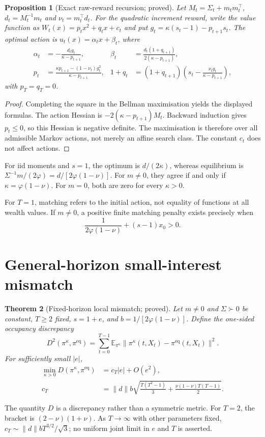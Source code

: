 \documentclass[11pt,a4paper]{article}
\theoremstyle{plain}
\newtheorem{theorem}{Theorem}
\newtheorem{proposition}[theorem]{Proposition}
\theoremstyle{definition}
\theoremstyle{remark}
\newcommand{\E}{\mathbb{E}}
\newcommand{\pieq}{\pi^{\mathrm{eq}}}
\begin{document}
\begin{proposition}[Exact raw-reward recursion; proved]
Let $M_t=\Sigma_t+m_tm_t^{\top}$, $d_t=M_t^{-1}m_t$ and
$\nu_t=m_t^{\top}d_t$. For the quadratic increment reward, write the value function as
$W_t(x)=p_tx^2+q_tx+c_t$ and put
$g_t=\kappa(s_t-1)-p_{t+1}s_t$. The optimal action is
$u_t(x)=\alpha_tx+\beta_t$, where
\begin{align}
 \alpha_t&=-\frac{d_tg_t}{\kappa-p_{t+1}},&
 \beta_t&=\frac{d_t(1+q_{t+1})}{2(\kappa-p_{t+1})},\\
 p_t&=\frac{\kappa p_{t+1}-(1-\nu_t)g_t^2}{\kappa-p_{t+1}},&
 1+q_t&=(1+q_{t+1})\left(s_t-\frac{\nu_tg_t}{\kappa-p_{t+1}}\right),
\end{align}
with $p_T=q_T=0$.
\end{proposition}
\begin{proof}
Completing the square in the Bellman maximisation yields the displayed formulas.
The action Hessian is $-2(\kappa-p_{t+1})M_t$. Backward induction gives $p_t\le0$,
so this Hessian is negative definite. The maximisation is therefore over all
admissible Markov actions, not merely an affine search class. The constant $c_t$
does not affect actions.
\end{proof}
For iid moments and $s=1$, the optimum is $d/(2\kappa)$, whereas equilibrium is
$\Sigma^{-1}m/(2\varphi)=d/[2\varphi(1-\nu)]$. For $m\ne0$, they agree if and
only if $\kappa=\varphi(1-\nu)$. For $m=0$, both are zero for every $\kappa>0$.

For $T=1$, matching refers to the initial action, not equality of functions at
all wealth values. If $m\ne0$, a positive finite matching penalty exists precisely when
\[
 \frac{1}{2\varphi(1-\nu)}+(s-1)x_0>0.
\]

\ifdim\dimexpr\pagegoal-\pagetotal\relax<120pt\newpage\fi
\section{General-horizon small-interest mismatch}
\label{app:horizon}
\begin{theorem}[Fixed-horizon local mismatch; proved]
Let $m\ne0$ and $\Sigma\succ0$ be constant, $T\ge2$ fixed, $s=1+e$, and
$b=1/[2\varphi(1-\nu)]$. Define the one-sided occupancy discrepancy
\[
 D^2(\pi^\kappa,\pieq)
 =\sum_{t=0}^{T-1}\E_{\pi^\kappa}
   \bigl\|\pi^\kappa(t,X_t)-\pieq(t,X_t)\bigr\|^2.
\]
For sufficiently small $|e|$,
\begin{align}
 \min_{\kappa>0}D(\pi^\kappa,\pieq)&=c_T|e|+O(e^2),\\
 c_T&=\|d\|b\sqrt{\frac{T(T^2-1)}{3}
            +\frac{\nu(1-\nu)T(T-1)}{2}}.
\end{align}
\end{theorem}
The quantity $D$ is a discrepancy rather than a symmetric metric. For $T=2$,
the bracket is $(2-\nu)(1+\nu)$. As $T\to\infty$ with other parameters fixed,
$c_T\sim\|d\|bT^{3/2}/\sqrt{3}$; no uniform joint limit in $e$ and $T$ is asserted.
\end{document}
